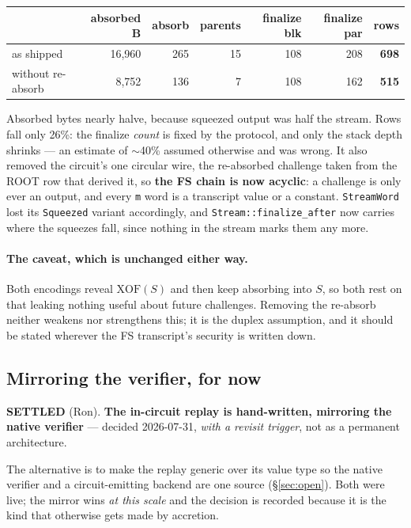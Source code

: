 \documentclass[11pt]{article}
\newcommand{\code}[1]{\texttt{#1}}
\newcommand{\settled}[1]{\medskip\noindent\textbf{SETTLED} (#1).\xspace}
\theoremstyle{definition}
\begin{document}
\begin{center}
\begin{tabular}{lrrrrrr}
 & absorbed B & absorb & parents & finalize blk & finalize par & \textbf{rows} \\
\hline
as shipped        & 16{,}960 & 265 & 15 & 108 & 208 & \textbf{698} \\
without re-absorb &  8{,}752 & 136 &  7 & 108 & 162 & \textbf{515} \\
\end{tabular}
\end{center}

\noindent
Absorbed bytes nearly halve, because squeezed output was half the stream. Rows
fall only 26\%: the finalize \emph{count} is fixed by the protocol, and only
the stack depth shrinks --- an estimate of $\sim$40\% assumed otherwise and was
wrong. It also removed the circuit's one circular wire, the re-absorbed
challenge taken from the ROOT row that derived it, so \textbf{the FS chain is
now acyclic}: a challenge is only ever an output, and every \code{m} word is a
transcript value or a constant. \code{StreamWord} lost its \code{Squeezed}
variant accordingly, and \code{Stream::finalize\_after} now carries where the
squeezes fall, since nothing in the stream marks them any more.

\paragraph{The caveat, which is unchanged either way.} Both encodings reveal
$\mathrm{XOF}(S)$ and then keep absorbing into $S$, so both rest on that
leaking nothing useful about future challenges. Removing the re-absorb neither
weakens nor strengthens this; it is the duplex assumption, and it should be
stated wherever the FS transcript's security is written down.

\subsection{Mirroring the verifier, for now}\label{sec:mirror}

\settled{Ron} \textbf{The in-circuit replay is hand-written, mirroring the
native verifier} --- decided 2026-07-31, \emph{with a revisit trigger}, not as
a permanent architecture.

The alternative is to make the replay generic over its value type so the
native verifier and a circuit-emitting backend are one source
(\S\ref{sec:open}). Both were live; the mirror wins \emph{at this scale} and
the decision is recorded because it is the kind that otherwise gets made by
accretion.
\end{document}
